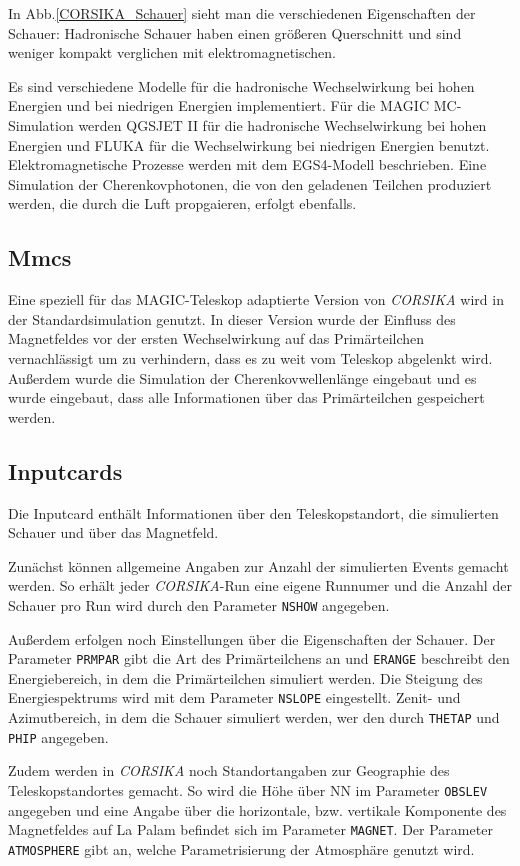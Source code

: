 In Abb.\ref{CORSIKA_Schauer} sieht man die verschiedenen Eigenschaften der Schauer: Hadronische Schauer haben einen größeren Querschnitt und sind weniger kompakt verglichen mit elektromagnetischen.

Es sind verschiedene Modelle für die hadronische Wechselwirkung bei hohen Energien und bei niedrigen Energien implementiert.
Für die MAGIC MC-Simulation werden QGSJET II für die hadronische Wechselwirkung bei hohen Energien und FLUKA für die Wechselwirkung bei niedrigen Energien benutzt.
Elektromagnetische Prozesse werden mit dem EGS4-Modell beschrieben.
Eine Simulation der Cherenkovphotonen, die von den geladenen Teilchen produziert werden, die durch die Luft propgaieren, erfolgt ebenfalls.

\subsection{Mmcs}
Eine speziell für das MAGIC-Teleskop adaptierte Version von \textit{CORSIKA} wird in der Standardsimulation genutzt.
In dieser Version wurde der Einfluss des Magnetfeldes vor der ersten Wechselwirkung auf das Primärteilchen vernachlässigt um zu verhindern, dass es zu weit vom Teleskop abgelenkt wird.
Außerdem wurde die Simulation der Cherenkovwellenlänge eingebaut und es wurde eingebaut, dass alle Informationen über das Primärteilchen gespeichert werden.

\subsection{Inputcards}
Die Inputcard enthält Informationen über den Teleskopstandort, die simulierten Schauer und über das Magnetfeld.

Zunächst können allgemeine Angaben zur Anzahl der simulierten Events gemacht werden. 
So erhält jeder \textit{CORSIKA}-Run eine eigene Runnumer und die Anzahl der Schauer pro Run wird durch den Parameter \texttt{NSHOW} angegeben.

Außerdem erfolgen noch Einstellungen über die Eigenschaften der Schauer.
Der Parameter \texttt{PRMPAR} gibt die Art des Primärteilchens an und \texttt{ERANGE} beschreibt den Energiebereich, in dem die Primärteilchen simuliert werden.
Die Steigung des Energiespektrums wird mit dem Parameter \texttt{NSLOPE} eingestellt.
Zenit- und Azimutbereich, in dem die Schauer simuliert werden, wer den durch \texttt{THETAP} und \texttt{PHIP} angegeben.

Zudem werden in \textit{CORSIKA} noch Standortangaben zur Geographie des Teleskopstandortes gemacht.
So wird die Höhe über NN im Parameter \texttt{OBSLEV} angegeben und eine Angabe über die horizontale, bzw. vertikale Komponente des Magnetfeldes auf La Palam befindet sich im Parameter \texttt{MAGNET}.
Der Parameter \texttt{ATMOSPHERE} gibt an, welche Parametrisierung der Atmosphäre genutzt wird.

